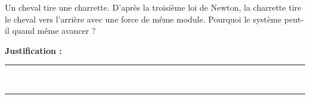 Un cheval tire une charrette. D'après la troisième loi de Newton, la charrette tire le cheval vers l'arrière avec une force de même module. Pourquoi le système peut-il quand même avancer ?

\choices

\noindent\textbf{Justification :} \hrulefill \\[2.5ex]
\rule{\linewidth}{0.4pt} \\[2.5ex]
\rule{\linewidth}{0.4pt}
\vfill
